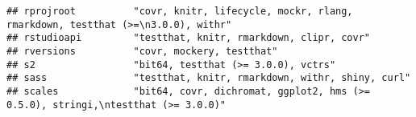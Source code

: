 \documentclass[
]{article}
\begin{document}
\begin{verbatim}
## rprojroot          "covr, knitr, lifecycle, mockr, rlang, rmarkdown, testthat (>=\n3.0.0), withr"                                                                                                                                                                                                                                                                                                                                                                                                    
## rstudioapi         "testthat, knitr, rmarkdown, clipr, covr"                                                                                                                                                                                                                                                                                                                                                                                                                                         
## rversions          "covr, mockery, testthat"                                                                                                                                                                                                                                                                                                                                                                                                                                                         
## s2                 "bit64, testthat (>= 3.0.0), vctrs"                                                                                                                                                                                                                                                                                                                                                                                                                                               
## sass               "testthat, knitr, rmarkdown, withr, shiny, curl"                                                                                                                                                                                                                                                                                                                                                                                                                                  
## scales             "bit64, covr, dichromat, ggplot2, hms (>= 0.5.0), stringi,\ntestthat (>= 3.0.0)"                                                                                                                                                                                                                                                                                                                                                                                                  

\end{verbatim}
\end{document}
